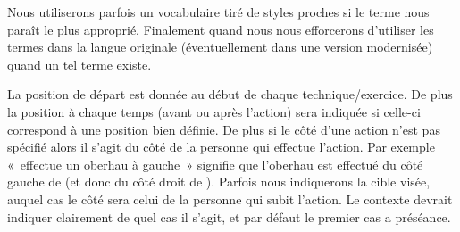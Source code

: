 Nous utiliserons parfois un vocabulaire tiré de styles proches si le terme nous paraît le plus approprié.
Finalement quand nous nous efforcerons d'utiliser les termes dans la langue originale (éventuellement dans une version modernisée) quand un tel terme existe.

La position de départ est donnée au début de chaque technique/exercice.
De plus la position à chaque temps (avant ou après l'action) sera indiquée si celle-ci correspond à une position bien définie.
De plus si le côté d'une action n'est pas spécifié alors il s'agit du côté de la personne qui effectue l'action.
Par exemple « \A effectue un oberhau à gauche » signifie que l'oberhau est effectué du côté gauche de \A (et donc du côté droit de \D).
Parfois nous indiquerons la cible visée, auquel cas le côté sera celui de la personne qui subit l'action.
Le contexte devrait indiquer clairement de quel cas il s'agit, et par défaut le premier cas a préséance.

% 
